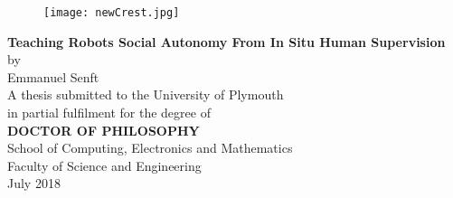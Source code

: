 \begin{center}
\begin{figure}[h]
\centering
\texttt{[image: newCrest.jpg]}
\end{figure}
\vspace{36pt}
\LARGE 
\textbf{Teaching Robots Social Autonomy From In Situ Human Supervision}
\\
\vspace{12pt}
\Large by
\\
\vspace{12pt}
\LARGE 
Emmanuel Senft
\\
\vspace{48pt}
\Large 
A thesis submitted to the University of Plymouth
\\
in partial fulfilment for the degree of
\vspace{36pt}
\\
\textbf{DOCTOR OF PHILOSOPHY}
\vspace{36pt}
\\
School of Computing, Electronics and Mathematics\\
Faculty of Science and Engineering
\vspace{36pt}
\\
\vspace{36pt}
July 2018
\end{center}

\normalsize
